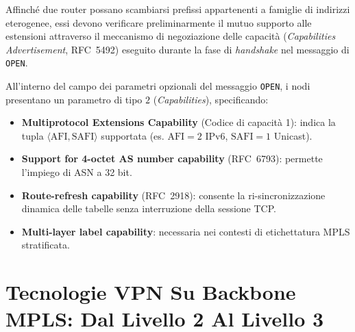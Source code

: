 \documentclass[11pt, a4paper]{article}
\begin{document}
Affinché due router possano scambiarsi prefissi appartenenti a famiglie di indirizzi eterogenee, essi devono verificare preliminarmente il mutuo supporto alle estensioni attraverso il meccanismo di negoziazione delle capacità (\emph{Capabilities Advertisement}, RFC~5492) eseguito durante la fase di \emph{handshake} nel messaggio di \texttt{OPEN}.



All'interno del campo dei parametri opzionali del messaggio \texttt{OPEN}, i nodi presentano un parametro di tipo $2$ (\emph{Capabilities}), specificando:
\begin{itemize}[noitemsep]
    \item \textbf{Multiprotocol Extensions Capability} (Codice di capacità 1): indica la tupla $\langle\text{AFI}, \text{SAFI}\rangle$ supportata (es. $\text{AFI}=2$ IPv6, $\text{SAFI}=1$ Unicast).
    \item \textbf{Support for 4-octet AS number capability} (RFC~6793): permette l'impiego di ASN a 32 bit.
    \item \textbf{Route-refresh capability} (RFC~2918): consente la ri-sincronizzazione dinamica delle tabelle senza interruzione della sessione TCP.
    \item \textbf{Multi-layer label capability}: necessaria nei contesti di etichettatura MPLS stratificata.
\end{itemize}



\section{Tecnologie VPN Su Backbone MPLS: Dal Livello 2 Al Livello 3}
\end{document}
